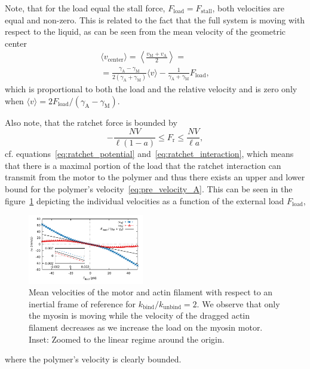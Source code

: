 \documentclass[aps,pre,twocolumn,showpacs,showkeys,superscriptaddress,floatfix]{revtex4-1}
\begin{document}
Note, that for the load equal the stall force, $F_\text{load} = F_\text{stall}$, both velocities are equal and non-zero.
This is related to the fact that the full system is moving with respect to the liquid, as can be seen from the mean velocity of the geometric center 
\begin{multline*}
\langle v_\text{center} \rangle = \left\langle \frac{ v_\text{M} + v_\text{A} }{2} \right\rangle 
= \\
= \frac{ \gamma_\text{A} - \gamma_\text{M} }{ 2 ( \gamma_\text{A} + \gamma_\text{M} ) } \langle v \rangle - \frac{1}{ \gamma_\text{A} + \gamma_\text{M} } F_\text{load}
, 
\end{multline*}
which is proportional to both the load and the relative velocity and is zero only when $\langle v \rangle = 2 F_\text{load} / ( \gamma_\text{A} - \gamma_\text{M} )$.

Also note, that the ratchet force is bounded by 
\begin{equation}
- \frac{ N V }{ \ell (1-a) } 
\le 
F_\text{r}
\le
\frac{ N V }{ \ell a } ,
\label{eq:ratchet_force_bounds}
\end{equation}
cf. equations~\eqref{eq:ratchet_potential} and~\eqref{eq:ratchet_interaction}, 
which means that there is a maximal portion of the load that the ratchet interaction can transmit from the motor to the polymer 
and thus there exists an upper and lower bound for the polymer's velocity~\eqref{eq:pre_velocity_A}.   
This can be seen in the figure~\ref{fig:ind_v} depicting the individual velocities as a function of the external load $F_\text{load}$,  
\begin{figure}[t]
\centering
\includegraphics[width=0.45\textwidth,height=!]{individual_velocities}
\caption{
\label{fig:ind_v} 
Mean velocities of the motor and actin filament with respect to an inertial frame of reference for $k_\text{bind}/k_\text{unbind} = 2$.
We observe that only the myosin is moving while the velocity of the dragged actin filament decreases as we increase the load on the myosin motor.
Inset: Zoomed to the linear regime around the origin.
}
\end{figure}
where the polymer's velocity is clearly bounded. 
\end{document}
